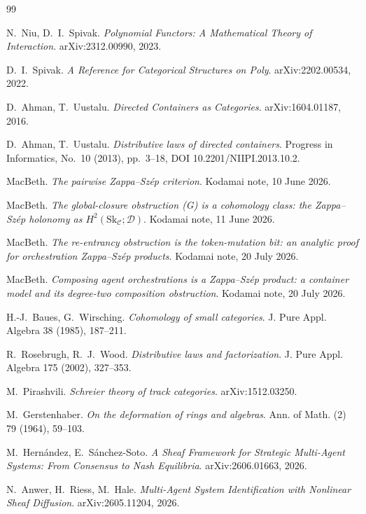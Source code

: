 \documentclass[11pt]{amsart}
\theoremstyle{definition}
\theoremstyle{remark}
\newcommand{\C}{\mathcal{C}}
\newcommand{\Sk}{\mathrm{Sk}}
\newcommand{\dir}{\mathcal{D}}
\begin{document}
\begin{thebibliography}{99}

 N.~Niu, D.~I.~Spivak. \emph{Polynomial Functors: A Mathematical Theory of
Interaction}. arXiv:2312.00990, 2023.

 D.~I.~Spivak. \emph{A Reference for Categorical Structures on \textup{Poly}}.
arXiv:2202.00534, 2022.

 D.~Ahman, T.~Uustalu. \emph{Directed Containers as Categories}.
arXiv:1604.01187, 2016.

 D.~Ahman, T.~Uustalu. \emph{Distributive laws of directed containers}.
Progress in Informatics, No.~10 (2013), pp.~3--18, DOI 10.2201/NIIPI.2013.10.2.

 MacBeth. \emph{The pairwise Zappa--Sz\'ep criterion}. Kodamai note, 10 June 2026.

 MacBeth. \emph{The global-closure obstruction \textnormal{(G)} is a cohomology
class: the Zappa--Sz\'ep holonomy as $H^2(\Sk_\C;\dir)$}. Kodamai note, 11 June 2026.

 MacBeth. \emph{The re-entrancy obstruction is the token-mutation bit: an analytic
proof for orchestration Zappa--Sz\'ep products}. Kodamai note, 20 July 2026.

 MacBeth. \emph{Composing agent orchestrations is a Zappa--Sz\'ep product: a
container model and its degree-two composition obstruction}. Kodamai note, 20 July 2026.

 H.-J.~Baues, G.~Wirsching. \emph{Cohomology of small categories}. J. Pure
Appl. Algebra 38 (1985), 187--211.

 R.~Rosebrugh, R.~J.~Wood. \emph{Distributive laws and factorization}. J. Pure Appl.
Algebra 175 (2002), 327--353.

 M.~Pirashvili. \emph{Schreier theory of track categories}. arXiv:1512.03250.

 M.~Gerstenhaber. \emph{On the deformation of rings and algebras}. Ann. of
Math. (2) 79 (1964), 59--103.

 M.~Hern\'andez, E.~S\'anchez-Soto. \emph{A Sheaf Framework for Strategic
Multi-Agent Systems: From Consensus to Nash Equilibria}. arXiv:2606.01663, 2026.

 N.~Anwer, H.~Riess, M.~Hale. \emph{Multi-Agent System Identification with Nonlinear
Sheaf Diffusion}. arXiv:2605.11204, 2026.

\end{thebibliography}
\end{document}
